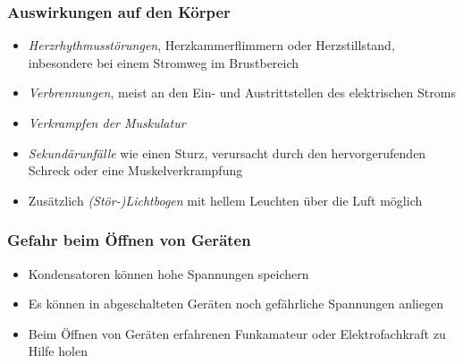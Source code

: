 \begin{frame}
\frametitle{Auswirkungen auf den Körper}
\begin{itemize}
  \item \emph{Herzrhythmusstörungen}, Herzkammerflimmern oder Herzstillstand, inbesondere bei einem Stromweg im Brustbereich
  \item \emph{Verbrennungen}, meist an den Ein- und Austrittstellen des elektrischen Stroms
  \item \emph{Verkrampfen der Muskulatur}
  \item \emph{Sekundärunfälle} wie einen Sturz, verursacht durch den hervorgerufenden Schreck oder eine Muskelverkrampfung
  \item Zusätzlich \emph{(Stör-)Lichtbogen} mit hellem Leuchten über die Luft möglich
  \end{itemize}
\end{frame}

\begin{frame}
\frametitle{Gefahr beim Öffnen von Geräten}
\begin{itemize}
  \item Kondensatoren können hohe Spannungen speichern
  \item Es können in abgeschalteten Geräten noch gefährliche Spannungen anliegen
  \item Beim Öffnen von Geräten erfahrenen Funkamateur oder Elektrofachkraft zu Hilfe holen
  \end{itemize}
\end{frame}

\begin{frame}
\end{frame}

